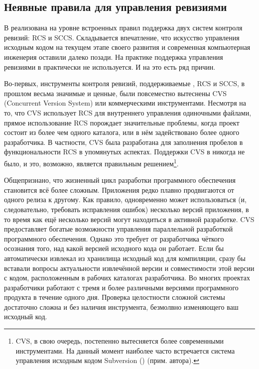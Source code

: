 \subsection{Неявные правила для управления ревизиями}
В \GNUmake{} реализована на уровне встроенных правил поддержка двух
 
систем контроля ревизий: RCS и SCCS. Складывается впечатление, что
искусство управления исходным кодом на текущем этапе своего развития
и современная компьютерная инженерия оставили \GNUmake{} далеко позади.
На практике поддержка управления ревизиями в \GNUmake{} практически
не используется. И на это есть ряд причин.

Во\hyp{}первых, инструменты контроля ревизий, поддерживаемые
\GNUmake{}, RCS и SCCS, в прошлом весьма значимые и ценные, были
повсеместно вытеснены CVS (Concurrent Version System) или
коммерческими инструментами. Несмотря на то, что CVS использует RCS
для внутреннего управления одиночными файлами, прямое использование
RCS порождает значительные проблемы, когда проект состоит из более чем
одного каталога, или в нём задействовано более одного разработчика. В
частности, CVS была разработана для заполнения пробелов в
функциональности RCS в упомянутых аспектах. Поддержки CVS в \GNUmake{}
никогда не было, и это, возможно, является правильным
решением\footnote{CVS, в свою очередь, постепенно вытесняется более
современными инструментами. На данный момент наиболее часто
встречается система управления исходным кодом
Subversion ()
(прим. автора).}.

Общепризнано, что жизненный цикл разработки программного обеспечения
становится всё более сложным. Приложения редко плавно продвигаются от
одного релиза к другому. Как правило, одновременно может
использоваться (и, следовательно, требовать исправления ошибок)
несколько версий приложения, в то время как ещё несколько версий могут
находиться в активной разработке. CVS предоставляет богатые
возможности управления параллельной разработкой программного
обеспечения. Однако это требует от разработчика чёткого осознания
того, над какой версией исходного кода он работает. Если бы \GNUmake{}
автоматически извлекал из хранилища исходный код для компиляции, сразу
бы вставали вопросы актуальности извлечённой версии и совместимости
этой версии с кодом, расположенным в рабочих каталогах разработчика.
Во многих проектах разработчики работают с тремя и более различными
версиями программного продукта в течение одного дня. Проверка
целостности сложной системы достаточно сложна и без наличия
инструмента, безмолвно изменяющего ваш исходный код.

